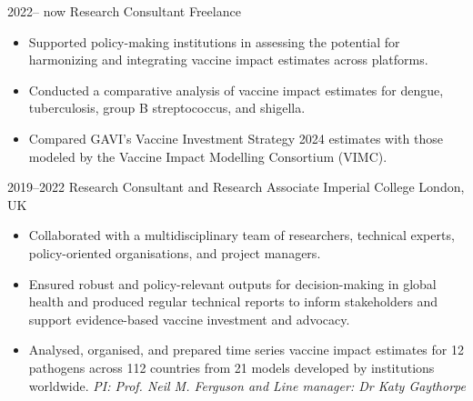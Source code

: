 \documentclass[icon]{twentysecondcv}
\begin{document}
\begin{twenty} %


 \twentyitem
    	{2022-- now}
    	{Research Consultant}
	{Freelance}
        	{\small \begin{itemize}
        	 \item Supported policy-making institutions in assessing the potential for harmonizing and integrating vaccine impact estimates across platforms.
  \item Conducted a comparative analysis of vaccine impact estimates for dengue, tuberculosis, group B streptococcus, and shigella.
  \item Compared GAVI’s Vaccine Investment Strategy 2024 estimates with those modeled by the Vaccine Impact Modelling Consortium (VIMC).
 
\end{itemize}}
        	
        	
	
 \twentyitem
       {2019--2022}
       {Research Consultant and Research Associate}
       {Imperial College London, UK}
       {\small  \begin{itemize}
       
  \item Collaborated with a multidisciplinary team of researchers, technical experts, policy-oriented organisations, and project managers.
  \item Ensured robust and policy-relevant outputs for decision-making in global health and produced regular technical reports to inform stakeholders and support evidence-based vaccine investment and advocacy.
  \item Analysed, organised, and prepared time series vaccine impact estimates for 12 pathogens across 112 countries from 21 models developed by institutions worldwide. \textit{ PI: Prof. Neil M. Ferguson and Line manager: Dr Katy Gaythorpe}


\end{itemize}}
\end{twenty}
\end{document}

